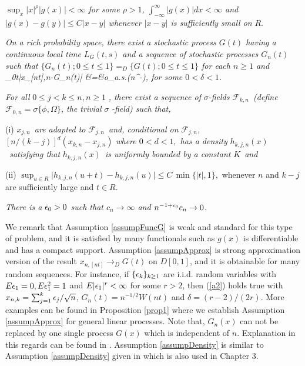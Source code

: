 \begin{assump}  \textit{
$\sup_x |x|^{\rho} |g(x)|<\infty$ for some $\rho > 1$, $\int_{-\infty}^{\infty}|g(x)|dx<\infty$ \textit{and }\
$|g(x)-g(y)|\le C|x-y|$ whenever  $|x-y|$ is sufficiently small on }$R$.
\end{assump}


\begin{assump} 
 \textit{On a rich probability space, there exist a stochastic process $G(t)$ having a continuous local time $L_G(t,s)$ and a sequence of stochastic processes $G_n(t)$  such that $\{G_n(t); 0 \le t \le 1\} =_D \{G(t); 0 \le t \le 1\}$ for each $n \ge 1$ and 
\be
 \sup_{0\le t}|x_{[nt],n}-G_n(t)| &=&o_{a.s.}(n^{-\delta}),
 \la {a2}
\ee
for some $0<\delta<1$. }
\end{assump}

\begin{assump} 
 \textit{For all }$0\leq j<k\leq n,n\geq 1$%
\textit{, there exist  a
sequence of }$\sigma $\textit{-fields }${\mathcal F}_{k,n}$\textit{\ (define }$%
{\mathcal F}_{0,n}=\sigma \{\phi ,\Omega \}$\textit{, the trivial }$\sigma $\textit{%
-field) such that,}

(i) $x_{j,n}$\textit{\ are adapted to }${\mathcal F}_{j,n}$\textit{\
and, conditional on }${\mathcal F}_{j,n}$\textit{,
}$[n/(k-j)]^d(x_{k,n}-x_{j,n})$\textit{ where $0<d<1,$ has a density
}$h_{k,j,n}(x)$\textit{\ satisfying that }$h_{k,j,n}(x)$\textit{\ is
uniformly bounded by a constant }$K$\textit{\ and }%

(ii) $  \sup_{u\in R}\big|h_{k,j,n}(u+t)-h_{k,j,n}(u)\big|\le C\, \min\{|t|, 1\},$
whenever $n$ and $k-j$ are sufficiently large and $t\in R$.
\end{assump}

\begin{assump} 
 \textit{There is a $\epsilon_0>0$ such that $c_n\to\infty$ and $n^{-1+\epsilon_0}c_n\to 0$. }
\end{assump}

We remark that Assumption \ref{assumpFuncG} is weak and standard
  for this type of problem, and it is satisfied by many functionals such as $g(x)$ is differentiable and has a compact support. Assumption \ref{assumpApprox} is strong approximation version of the result $x_{n, [nt]}\to_D G(t)$ on $D[0,1]$, and it is obtainable for many random sequences. For instance,  if $\{\epsilon_k\}_{k\ge 1}$ are i.i.d. random variables with $E\epsilon_1=0, E\epsilon_1^2=1$ and $E|\epsilon_1|^{r}<\infty$
  for some $r>2$, then (\ref {a2}) holds true with $x_{n,k}=\sum_{j=1}^k\epsilon_j/\sqrt n$, $G_n(t) = n^{-1/2} W(nt)$ and $\delta=(r - 2) / (2r)$. More examples can be found in Proposition \ref{prop1} where we establish  Assumption \ref{assumpApprox} for general linear processes. Note that, $G_n(x)$ can not be replaced by one single process $G(x)$ which is independent of $n$. Explanation in this regards can be found in \cite{csorgorevesz1981}.
  Assumption \ref{assumpDensity} is  similar to Assumption \ref{assumpDensity} given in \cite{wangphillips2010a} which is also used in Chapter 3.



